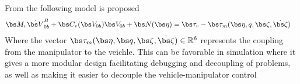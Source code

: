From \cite{antonelli1} the following model is proposed
\begin{align}
\label{eq:1}
\bs M_v \dot{\bs V}_{0b}^B + \bs C_v(\bs V_{0b})\bs V_{0b}+\bs N(\bs \eta) &= \bs \tau_v - \bs \tau_m(\bs \eta,q,\bs \zeta,\dot{\bs \zeta})
 \end{align}
 Where the vector $\bs \tau_m(\bs \eta,\bs q,\bs \zeta,\dot{\bs \zeta}) \in \mathbb R^6$ represents the coupling from the manipulator to the veichle. This can be favorable in simulation where it gives a more modular design facilitating debugging and decoupling of problems, as well as making it easier to decouple the vehicle-manipulator control


























